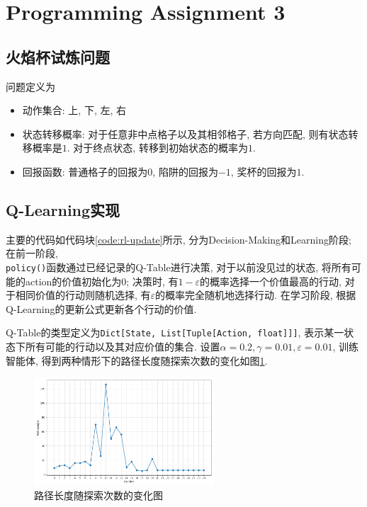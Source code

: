 \section{Programming Assignment 3}

\subsection{火焰杯试炼问题}

问题定义为
\begin{itemize}
    \item 动作集合: 上, 下, 左, 右
    \item 状态转移概率: 对于任意非中点格子以及其相邻格子, 若方向匹配, 则有状态转移概率是$1$. 对于终点状态, 转移到初始状态的概率为$1$.
    \item 回报函数: 普通格子的回报为$0$, 陷阱的回报为$-1$, 奖杯的回报为$1$.
\end{itemize}

\subsection{Q-Learning实现}



主要的代码如代码块\ref{code:rl-update}所示, 分为Decision-Making和Learning阶段; 在前一阶段, \\\verb|policy()|函数通过已经记录的Q-Table进行决策, 对于以前没见过的状态, 将所有可能的action的价值初始化为0; 决策时, 有$1-\varepsilon$的概率选择一个价值最高的行动, 对于相同价值的行动则随机选择, 有$\varepsilon$的概率完全随机地选择行动. 在学习阶段, 根据Q-Learning的更新公式更新各个行动的价值.

Q-Table的类型定义为\verb|Dict[State, List[Tuple[Action, float]]]|, 表示某一状态下所有可能的行动以及其对应价值的集合. 设置$\alpha=0.2, \gamma=0.01, \varepsilon=0.01$, 训练智能体, 得到两种情形下的路径长度随探索次数的变化如图\ref{fig:len}.

\begin{figure}[htbp]
    \centering
    \includegraphics[width=0.6\textwidth]{images/path_len.png}
    \caption{路径长度随探索次数的变化图}\label{fig:len}
\end{figure}

